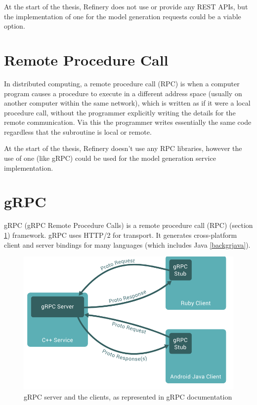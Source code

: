 	At the start of the thesis, Refinery does not use or provide any REST APIs, but the implementation of one for the model 
	generation requests could be a viable option.

\section{Remote Procedure Call} \label{backgrpc}
	In distributed computing, a remote procedure call (RPC) \cite{rpc} is when a computer program causes a procedure  
	to execute in a different address space 
	(usually on another computer within the same network), 
	which is written as if it were a local procedure call, without the programmer 
	explicitly writing the details for the remote communication. 
	Via this the programmer writes essentially the same code regardless that the subroutine is local or remote.

	At the start of the thesis, Refinery doesn't use any RPC libraries, however the use of one (like gRPC) could be used for the model generation service implementation.

\section{gRPC} \label{backgrgrpc}
	gRPC (gRPC Remote Procedure Calls) \cite{grpcwiki} is a remote procedure call (RPC) (section \ref{backgrpc}) framework. 
	gRPC uses HTTP/2 for transport.	It generates cross-platform client and server bindings for many languages (which includes 
	Java \ref{backgrjava}). 

	\begin{figure}[h!]
		\begin{center}
			\includegraphics[scale=0.8]{include/imgs/grpc_works.PNG}	
		\end{center}
		\caption{gRPC server and the clients, as represented in gRPC documentation \cite{grpcspec}}
	\end{figure}

